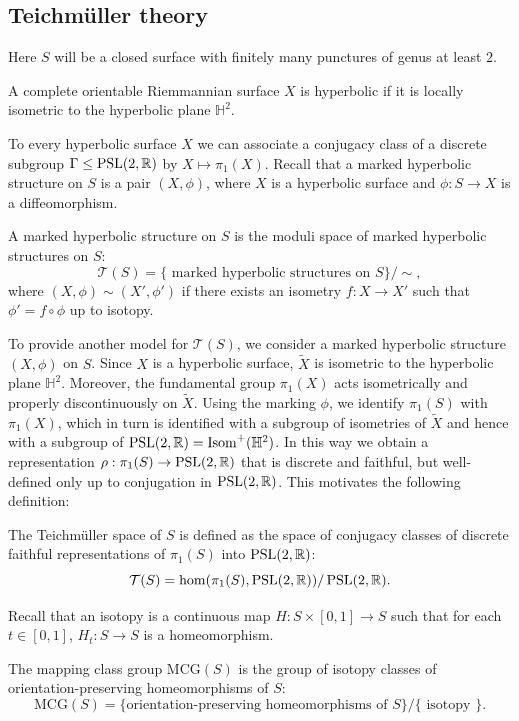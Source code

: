 \documentclass{report}
\begin{document}
\subsection{Teichmüller theory}
Here $S$ will be a closed surface with finitely many punctures of genus at least $2$.
\begin{definition}
    A complete orientable Riemmannian surface $X$ is hyperbolic if it is locally isometric to the hyperbolic plane $\mathbb H^2$.
\end{definition}
To every hyperbolic surface $X$ we can associate a conjugacy class of a discrete subgroup $\Gamma \leq \operatorname{{\mathrm{PSL}}}(2, \mathbb R)$ by $X \mapsto \pi_1(X)$.
Recall that a marked hyperbolic structure on $S$ is a pair $(X, \phi)$, where $X$ is a hyperbolic surface and $\phi: S \to X$ is a diffeomorphism.
\begin{definition}
    A marked hyperbolic structure on $S$ is the moduli space of marked hyperbolic structures on $S$:
    \[
    \mathcal T(S) = \{ \text{ marked hyperbolic structures on } S \}/\sim,
    \]
    where $(X, \phi) \sim (X', \phi')$ if there exists an isometry $f: X \to X'$ such that $\phi' = f \circ \phi$ up to isotopy.
\end{definition}
To provide another model for $\mathcal T(S)$, we consider a marked hyperbolic structure $(X, \phi)$ on $S$.
Since $X$ is a hyperbolic surface, $\tilde X$ is isometric to the hyperbolic plane $\mathbb H^2$.
Moreover, the fundamental group $\pi_1(X)$ acts isometrically and properly discontinuously on $\tilde X$.
Using the marking $\phi$, we identify $\pi_1(S)$ with $\pi_1(X)$, which in turn is identified with a subgroup of isometries of $\tilde X$ and hence with a subgroup of $\operatorname{{\mathrm{PSL}}}(2, \mathbb R) = \operatorname{Isom}^+(\mathbb H^2)$.
In this way we obtain a representation $\rho: \pi_1(S) \to \operatorname{{\mathrm{PSL}}}(2, \mathbb R)$ that is discrete and faithful, but well-defined only up to conjugation in $\operatorname{{\mathrm{PSL}}}(2, \mathbb R)$.
This motivates the following definition:
\begin{definition}
    The Teichmüller space of $S$ is defined as the space of conjugacy classes of discrete faithful representations of $\pi_1(S)$ into $\operatorname{{\mathrm{PSL}}}(2, \mathbb R)$:
    \[
    \mathcal T(S) = \hom(\pi_1(S), \operatorname{{\mathrm{PSL}}}(2, \mathbb R))/\operatorname{{\mathrm{PSL}}}(2, \mathbb R).
    \]
\end{definition}
Recall that an isotopy is a continuous map $H: S \times [0,1] \to S$ such that for each $t \in [0,1]$, $H_t: S \to S$ is a homeomorphism.
\begin{definition}
    The mapping class group $\mathrm{MCG}(S)$ is the group of isotopy classes of orientation-preserving homeomorphisms of $S$:
    \[
    \mathrm{MCG}(S) = \{\text{orientation-preserving homeomorphisms of } S\}/\{\text{ isotopy }\}.
    \]
\end{definition}
\end{document}
